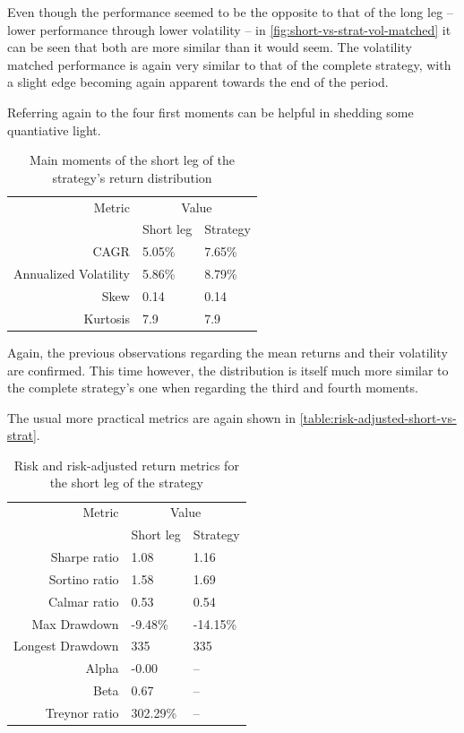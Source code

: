 Even though the performance seemed to be the opposite to that of the long leg -- lower performance through lower volatility -- in \autoref{fig:short-vs-strat-vol-matched} it can be seen that both are more similar than it would seem. The volatility matched performance is again very similar to that of the complete strategy, with a slight edge becoming again apparent towards the end of the period.

Referring again to the four first moments can be helpful in shedding some quantiative light.

\begin{table}[ht]
    \centering
    \begin{tabular}{rll}
        \toprule
        Metric & \multicolumn{2}{c}{Value} \\ 
        \cmidrule(lr){2-3}
            & Short leg & Strategy \\
        \midrule
        CAGR & 5.05\% & 7.65\% \\
        Annualized Volatility & 5.86\% & 8.79\% \\
        Skew & 0.14 & 0.14 \\
        Kurtosis & 7.9 & 7.9 \\
        \bottomrule
    \end{tabular}
    \caption{Main moments of the short leg of the strategy's return distribution}
    \label{table:main-moments-short-vs-strat}
\end{table}

Again, the previous observations regarding the mean returns and their volatility are confirmed. This time however, the distribution is itself much more similar to the complete strategy's one when regarding the third and fourth moments. 

The usual more practical metrics are again shown in \autoref{table:risk-adjusted-short-vs-strat}.
\newpage
\begin{table}[ht]
    \centering
    \begin{tabular}{rll}
        \toprule
        Metric & \multicolumn{2}{c}{Value} \\ 
        \cmidrule(lr){2-3}
            & Short leg & Strategy \\
        \midrule
        Sharpe ratio & 1.08 & 1.16 \\
        Sortino ratio & 1.58 & 1.69 \\
        Calmar ratio & 0.53 & 0.54 \\
        Max Drawdown & -9.48\% & -14.15\% \\
        Longest Drawdown & 335 & 335 \\
        Alpha & -0.00 & -- \\
        Beta & 0.67 & -- \\
        Treynor ratio & 302.29\% & -- \\
        \bottomrule
    \end{tabular}
    \caption{Risk and risk-adjusted return metrics for the short leg of the strategy}
    \label{table:risk-adjusted-short-vs-strat}
\end{table}

